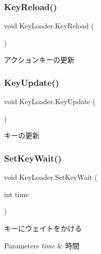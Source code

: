 \subsubsection{\texorpdfstring{Key\+Reload()}{KeyReload()}}
{\footnotesize\ttfamily void Key\+Loader.\+Key\+Reload (\begin{DoxyParamCaption}{ }\end{DoxyParamCaption})\hspace{0.3cm}{\ttfamily [inline]}}



アクションキーの更新 

\mbox{\label{class_key_loader_a1a4482487b406f1c9a3a0df3186f223c}} 
\subsubsection{\texorpdfstring{Key\+Update()}{KeyUpdate()}}
{\footnotesize\ttfamily void Key\+Loader.\+Key\+Update (\begin{DoxyParamCaption}{ }\end{DoxyParamCaption})\hspace{0.3cm}{\ttfamily [inline]}}



キーの更新 

\mbox{\label{class_key_loader_a7907d4061b1bfdf6bf007a5ce6ee24e8}} 
\subsubsection{\texorpdfstring{Set\+Key\+Wait()}{SetKeyWait()}}
{\footnotesize\ttfamily void Key\+Loader.\+Set\+Key\+Wait (\begin{DoxyParamCaption}\item[{int}]{time }\end{DoxyParamCaption})\hspace{0.3cm}{\ttfamily [inline]}}



キーにウェイトをかける 


\begin{DoxyParams}{Parameters}
{\em time} & 時間\\
\hline
\end{DoxyParams}
\mbox{\label{class_key_loader_a29ba5c6b4850d69c4d4577eb2e6159ec}} 
